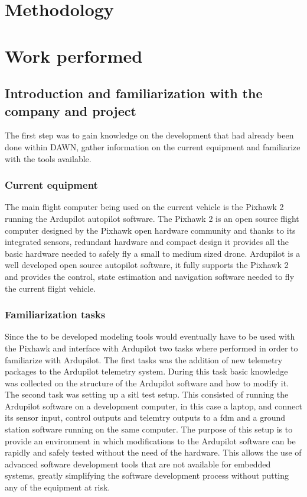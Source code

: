 \section{Methodology}

\section{Work performed}
\subsection{Introduction and familiarization with the company and project}
The first step was to gain knowledge on the development that had already been done within DAWN, gather information on the current equipment and familiarize with the tools available. \\

\subsubsection{Current equipment}
The main flight computer being used on the current vehicle is the Pixhawk 2 running the Ardupilot autopilot software. The Pixhawk 2 is an open source flight computer designed by the Pixhawk open hardware community and thanks to its integrated sensors, redundant hardware and compact design it provides all the basic hardware needed to safely fly a small to medium sized drone. Ardupilot is a well developed open source autopilot software, it fully supports the Pixhawk 2 and provides the control, state estimation and navigation software needed to fly the current flight vehicle. \\

\subsubsection{Familiarization tasks}
Since the to be developed modeling tools would eventually have to be used with the Pixhawk and interface with Ardupilot two tasks where performed in order to familiarize with Ardupilot. The first tasks was the addition of new telemetry packages to the Ardupilot telemetry system. During this task basic knowledge was collected on the structure of the Ardupilot software and how to modify it. \\

The second task was setting up a \gls{sitl} test setup. This consisted of running the Ardupilot software on a development computer, in this case a laptop, and connect its sensor input, control outputs and telemtry outputs to a \gls{fdm} and a ground station software running on the same computer. The purpose of this setup is to provide an environment in which modifications to the Ardupilot software can be rapidly and safely tested without the need of the hardware. This allows the use of advanced software development tools that are not available for embedded systems, greatly simplifying the software development process without putting any of the equipment at risk. \\

